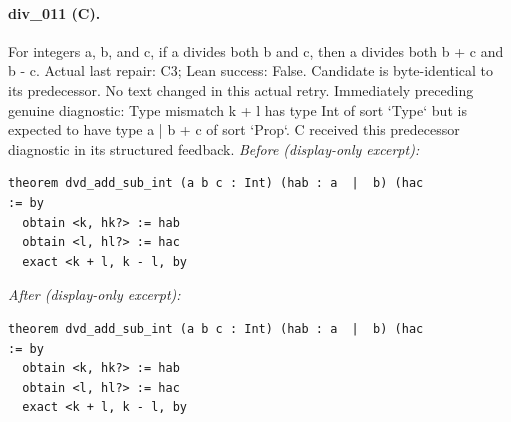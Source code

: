 \paragraph{div\_011 (C).}
For integers a, b, and c, if a divides both b and c, then a divides both b + c and b - c.
Actual last repair: C3; Lean success: False. Candidate is byte-identical to its predecessor.
No text changed in this actual retry.
Immediately preceding genuine diagnostic: Type mismatch
  k + l
has type
  Int
of sort `Type` but is expected to have type
  a  |  b + c
of sort `Prop`.
C received this predecessor diagnostic in its structured feedback.
\textit{Before (display-only excerpt):}
\begin{verbatim}
theorem dvd_add_sub_int (a b c : Int) (hab : a  |  b) (hac
:= by
  obtain <k, hk?> := hab
  obtain <l, hl?> := hac
  exact <k + l, k - l, by
\end{verbatim}
\textit{After (display-only excerpt):}
\begin{verbatim}
theorem dvd_add_sub_int (a b c : Int) (hab : a  |  b) (hac
:= by
  obtain <k, hk?> := hab
  obtain <l, hl?> := hac
  exact <k + l, k - l, by
\end{verbatim}
